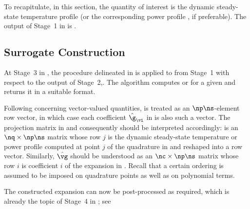 To recapitulate, in this section, the quantity of interest \g is the dynamic
steady-state temperature profile \mq (or the corresponding power profile \mp, if
preferable). The output of Stage~1 in  is
.

\subsection{Surrogate Construction}

At Stage~3 in , the procedure delineated in
 is applied to
 from Stage~1 with respect to the
output of Stage~2,. The algorithm computes \mp or \mq for a given \vu and
returns it in a suitable format.

Following  concerning vector-valued
quantities, \g is treated as an $\np \ns$-element row vector, in which case each
coefficient $\hat{\g}_{\vi}$ in  is also such a vector.
The projection matrix in  and consequently
 should be interpreted accordingly: \vg is an $\nq
\times \np \ns$ matrix whose row $j$ is the dynamic steady-state temperature or
power profile computed at point $j$ of the quadrature in
 and reshaped into a row vector. Similarly, $\hat{\vg}$
should be understood as an $\nc \times \np \ns$ matrix whose row $i$ is
coefficient $i$ of the expansion in . Recall that a
certain ordering is assumed to be imposed on quadrature points as well as on
polynomial terms.

The constructed expansion can now be post-processed as required, which is
already the topic of Stage~4 in ; see
